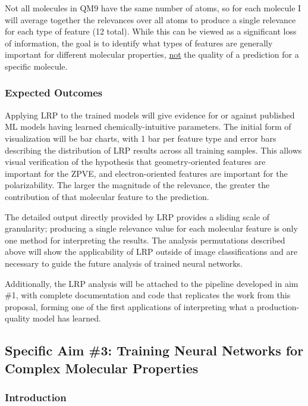 \documentclass[12pt]{article}
\begin{document}
Not all molecules in QM9 have the same number of atoms, so for each molecule I will average together the relevances over all atoms to produce a single relevance for each type of feature (12 total). While this can be viewed as a significant loss of information, the goal is to identify what types of features are generally important for different molecular properties, \uline{not} the quality of a prediction for a specific molecule.

\subsubsection{Expected Outcomes}
\label{sec:orgd76a42b}

Applying LRP to the trained models will give evidence for or against published ML models having learned chemically-intuitive parameters. The initial form of visualization will be bar charts, with 1 bar per feature type and error bars describing the distribution of LRP results across all training samples. This allows visual verification of the hypothesis that geometry-oriented features are important for the ZPVE, and electron-oriented features are important for the polarizability. The larger the magnitude of the relevance, the greater the contribution of that molecular feature to the prediction.

The detailed output directly provided by LRP provides a sliding scale of granularity; producing a single relevance value for each molecular feature is only one method for interpreting the results. The analysis permutations described above will show the applicability of LRP outside of image classifications and are necessary to guide the future analysis of trained neural networks.

Additionally, the LRP analysis will be attached to the pipeline developed in aim \#1, with complete documentation and code that replicates the work from this proposal, forming one of the first applications of interpreting what a production-quality model has learned.

\subsection{Specific Aim \#3: Training Neural Networks for Complex Molecular Properties}
\label{sec:org1b20f0c}

\subsubsection{Introduction}
\label{sec:org95a3c5a}
\end{document}
